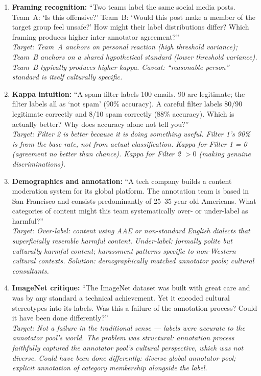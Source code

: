 \begin{enumerate}
    \item \textbf{Framing recognition:} ``Two teams label the same social media posts. Team~A: `Is this offensive?' Team~B: `Would this post make a member of the target group feel unsafe?' How might their label distributions differ? Which framing produces higher inter-annotator agreement?''\\
    \textit{Target: Team~A anchors on personal reaction (high threshold variance); Team~B anchors on a shared hypothetical standard (lower threshold variance). Team~B typically produces higher kappa. Caveat: ``reasonable person'' standard is itself culturally specific.}

    \item \textbf{Kappa intuition:} ``A spam filter labels 100 emails. 90 are legitimate; the filter labels all as `not spam' (90\% accuracy). A careful filter labels 80/90 legitimate correctly and 8/10 spam correctly (88\% accuracy). Which is actually better? Why does accuracy alone not tell you?''\\
    \textit{Target: Filter 2 is better because it is doing something useful. Filter 1's 90\% is from the base rate, not from actual classification. Kappa for Filter 1 = 0 (agreement no better than chance). Kappa for Filter 2 $> 0$ (making genuine discriminations).}

    \item \textbf{Demographics and annotation:} ``A tech company builds a content moderation system for its global platform. The annotation team is based in San Francisco and consists predominantly of 25--35 year old Americans. What categories of content might this team systematically over- or under-label as harmful?''\\
    \textit{Target: Over-label: content using AAE or non-standard English dialects that superficially resemble harmful content. Under-label: formally polite but culturally harmful content; harassment patterns specific to non-Western cultural contexts. Solution: demographically matched annotator pools; cultural consultants.}

    \item \textbf{ImageNet critique:} ``The ImageNet dataset was built with great care and was by any standard a technical achievement. Yet it encoded cultural stereotypes into its labels. Was this a failure of the annotation process? Could it have been done differently?''\\
    \textit{Target: Not a failure in the traditional sense --- labels were accurate to the annotator pool's world. The problem was structural: annotation process faithfully captured the annotator pool's cultural perspective, which was not diverse. Could have been done differently: diverse global annotator pool; explicit annotation of category membership alongside the label.}
\end{enumerate}

